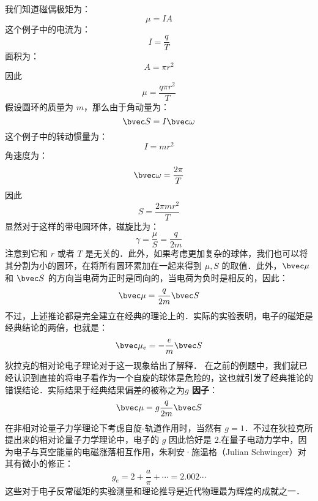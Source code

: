 我们知道磁偶极矩为：
\begin{equation}
\mu = IA
\end{equation}
这个例子中的电流为：
\begin{equation}
I=\frac{q}{T}
\end{equation}
面积为：
\begin{equation}
A= \pi r^2
\end{equation}
因此
\begin{equation}
\mu=\frac{q\pi r^2}{T}
\end{equation}
假设圆环的质量为 $m$，那么由于角动量为：
\begin{equation}
\bvec S = I\bvec\omega
\end{equation}
这个例子中的转动惯量为：
\begin{equation}
I = mr^2
\end{equation}
角速度为：
\begin{equation}
\bvec \omega = \frac{2\pi}{T}
\end{equation}
因此
\begin{equation}
S = \frac{2\pi m r^2}{T}
\end{equation}
显然对于这样的带电圆环体，磁旋比为：
\begin{equation}
\gamma = \frac{\mu}{S} = \frac{q}{2m}
\end{equation}
注意到它和 $r$ 或者 $T$ 是无关的．此外，如果考虑更加复杂的球体，我们也可以将其分割为小的圆环，在将所有圆环累加在一起来得到 $\mu,S$ 的取值．此外，$\bvec \mu$ 和 $\bvec S$ 的方向当电荷为正时是同向的，当电荷为负时是相反的，因此：
\begin{equation}
\bvec \mu = \frac{q}{2m}\bvec S
\end{equation}
不过，上述推论都是完全建立在经典的理论上的．实际的实验表明，电子的磁矩是经典结论的两倍，也就是：
\begin{equation}
\bvec \mu_e = -\frac{e}{m}\bvec S
\end{equation}
狄拉克的相对论电子理论对于这一现象给出了解释．
在之前的例题中，我们就已经认识到直接的将电子看作为一个自旋的球体是危险的，这也就引发了经典推论的错误结论．实际结果于经典结果偏差的被称之为\textbf{$g$ 因子}：
\begin{equation}\label{HfineS_eq43}
\bvec \mu = g\frac{q}{2m}\bvec S
\end{equation}
在非相对论量子力学理论下考虑自旋-轨道作用时，当然有 $g=1$．不过在狄拉克所提出来的相对论量子力学理论中，电子的 $g$ 因此恰好是 $2$.在量子电动力学中，因为电子与真空能量的电磁涨落相互作用，朱利安·施温格（Julian Schwinger）对其有微小的修正：
\begin{equation}
g_e = 2+\frac{a}{\pi}+\cdots = 2.002\cdots
\end{equation}
这些对于电子反常磁矩的实验测量和理论推导是近代物理最为辉煌的成就之一．


